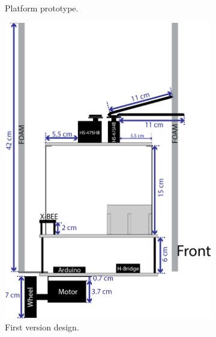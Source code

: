 \begin{figure}
\begin{subfigure}[c]{0.3\textwidth}
	\caption{Platform prototype.}
	\label{fig:triskar-prototype}
	\end{subfigure}
	\begin{subfigure}[c]{0.3\textwidth}
	\centering
	\includegraphics[width=\textwidth]{./Images/upperSecondC.png}
	\caption{First version design.}
	\label{fig:triskar-first-design}
	\end{subfigure}
	\\
	\begin{subfigure}[c]{0.3\textwidth}
	\centering

\end{subfigure}
\end{figure}
